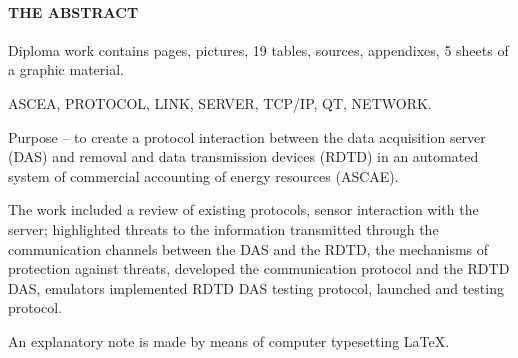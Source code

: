\newpage
{}
\paragraph*{\hfill THE ABSTRACT \hfill}

Diploma work contains  pages,  pictures, 19 tables,  sources,  appendixes, 5 sheets of a graphic material.

ASCEA, PROTOCOL, LINK, SERVER, TCP/IP, QT, NETWORK.

Purpose -- to create a protocol interaction between the data acquisition server (DAS) and removal and data transmission devices (RDTD) in an automated system of commercial accounting of energy resources (ASCAE).

The work included a review of existing protocols, sensor interaction with the server; highlighted threats to the information transmitted through the communication channels between the DAS and the RDTD, the mechanisms of protection against threats, developed the communication protocol and the RDTD DAS, emulators implemented RDTD DAS testing protocol, launched and testing protocol. 

An explanatory note is made by means of computer typesetting \LaTeX.